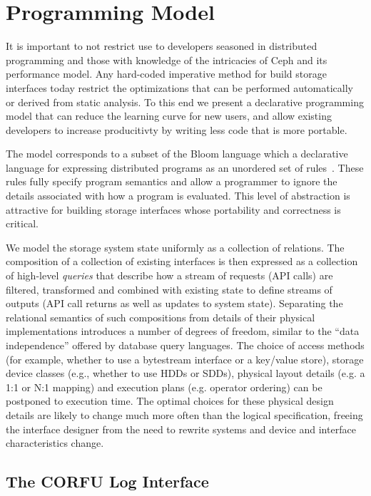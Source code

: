 \section{Programming Model}
\label{sec:prog-model}

It is important to not restrict use to developers seasoned in distributed
programming and those with knowledge of the intricacies of Ceph and its
performance model. Any hard-coded imperative method for build storage
interfaces today restrict the optimizations that can be performed
automatically or derived from static analysis.  To this end we present a
declarative programming model that can reduce the learning curve for new
users, and allow existing developers to increase producitivty by writing less
code that is more portable.

The model corresponds to a subset of the Bloom language which a
declarative language for expressing distributed programs as an unordered set
of rules~\cite{alvaro:cidr11}. These rules fully specify program semantics and allow a programmer
to ignore the details associated with how a program is evaluated. This level
of abstraction is attractive for building storage interfaces whose portability
and correctness is critical.

We model the storage system state uniformly as a collection of relations. The
composition of a collection of existing interfaces is then expressed as a
collection of high-level \emph{queries} that describe how a stream of requests
(API calls) are filtered, transformed and combined with existing state to
define streams of outputs (API call returns as well as updates to system
state).  Separating the relational semantics of such compositions from details
of their physical implementations introduces a number of degrees of freedom,
similar to the ``data independence'' offered by database query languages.  The
choice of access methods (for example, whether to use a bytestream interface
or a key/value store), storage device classes (e.g., whether to use HDDs or
SDDs), physical layout details (e.g. a 1:1 or N:1 mapping) and execution plans
(e.g. operator ordering) can be postponed to execution time.  The optimal
choices for these physical design details are likely to change much more often
than the logical specification, freeing the interface designer from the need
to rewrite systems and device and interface characteristics change.

\subsection{The CORFU Log Interface}

